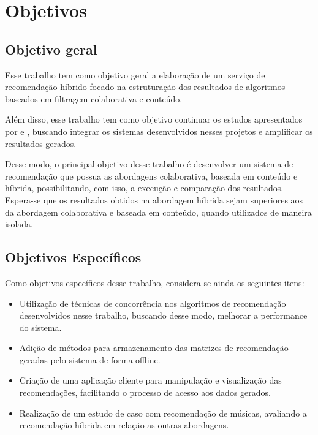 
\chapter{\textbf{Objetivos}} %

\section{Objetivo geral}

Esse trabalho tem como objetivo geral a elaboração de um serviço de recomendação híbrido focado na estruturação dos resultados de algoritmos baseados em filtragem colaborativa e conteúdo.

Além disso, esse trabalho tem como objetivo continuar os estudos apresentados por  e , buscando integrar os sistemas desenvolvidos nesses projetos e amplificar os resultados gerados.

Desse modo, o principal objetivo desse trabalho é desenvolver um sistema de recomendação que possua as abordagens colaborativa, baseada em conteúdo e híbrida, possibilitando, com isso, a execução e comparação dos resultados. Espera-se que os resultados obtidos na abordagem híbrida sejam superiores aos da abordagem colaborativa e baseada em conteúdo, quando utilizados de maneira isolada.

\section{Objetivos Específicos}

Como objetivos específicos desse trabalho, considera-se ainda os seguintes itens:
\begin{itemize}
    \item Utilização de técnicas de concorrência nos algoritmos de recomendação desenvolvidos nesse trabalho, buscando desse modo, melhorar a performance do sistema.
    \item Adição de métodos para armazenamento das matrizes de recomendação geradas pelo sistema de forma offline.
    \item Criação de uma aplicação cliente para manipulação e visualização das recomendações, facilitando o processo de acesso aos dados gerados.
    \item Realização de um estudo de caso com recomendação de músicas, avaliando a recomendação híbrida em relação as outras abordagens.
\end{itemize}{}